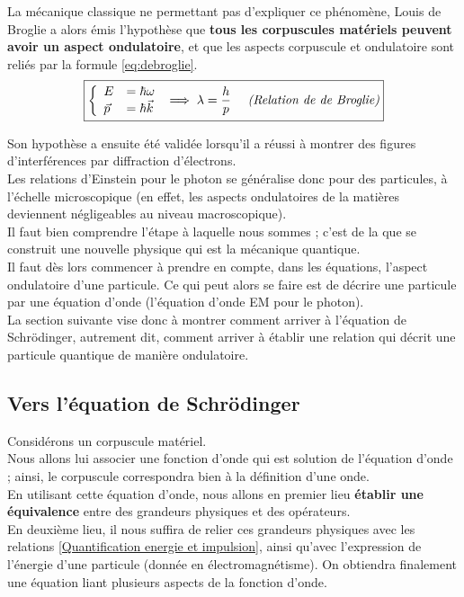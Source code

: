 \documentclass[12pt, a4paper]{book}
\begin{document}
La mécanique classique ne permettant pas d'expliquer ce phénomène, Louis de Broglie a alors émis l'hypothèse 
que \textbf{tous les corpuscules matériels peuvent avoir un aspect ondulatoire}, et que les aspects corpuscule et ondulatoire sont reliés par la formule \eqref{eq:debroglie}.
\begin{equation} \label{eq:debroglie}
\boxed{
\left\{ \begin{array}{ll}
E &= \hbar \omega \\
\vec p &= \hbar \vec k
\end{array} \right. \implies \lambda = \frac{h}{p} \quad \text{ \textit{(Relation de de Broglie)}}} 
\end{equation}

Son hypothèse a ensuite été validée lorsqu'il a réussi à montrer des figures d'interférences par diffraction d'électrons. \\
Les relations d'Einstein pour le photon se généralise donc pour des particules, à l'échelle microscopique (en effet, les aspects ondulatoires de la matières deviennent négligeables au niveau macroscopique). \\
Il faut bien comprendre l'étape à laquelle nous sommes ; c'est de la que se construit une nouvelle physique qui est la mécanique quantique. \\

Il faut dès lors commencer à prendre en compte, dans les équations, l'aspect ondulatoire d'une particule. Ce qui peut alors se faire est de décrire une particule par une équation d'onde (l'équation d'onde EM pour le photon).\\
La section suivante vise donc à montrer comment arriver à l'équation de Schrödinger, autrement dit, comment arriver à établir une relation qui décrit une particule quantique de manière ondulatoire. 

\subsection{Vers l'équation de Schrödinger}
Considérons un corpuscule matériel. \\
Nous allons lui associer une fonction d'onde qui est solution de l'équation d'onde ; ainsi, le corpuscule correspondra bien à la définition d'une onde. \\
En utilisant cette équation d'onde, nous allons en premier lieu \textbf{établir une équivalence} entre des grandeurs physiques et des opérateurs. \\
En deuxième lieu, il nous suffira de relier ces grandeurs physiques avec les relations \ref{Quantification energie et impulsion}, ainsi qu'avec l'expression de l'énergie d'une particule (donnée en électromagnétisme).
On obtiendra finalement une équation liant plusieurs aspects de la fonction d'onde.\\
\end{document}
